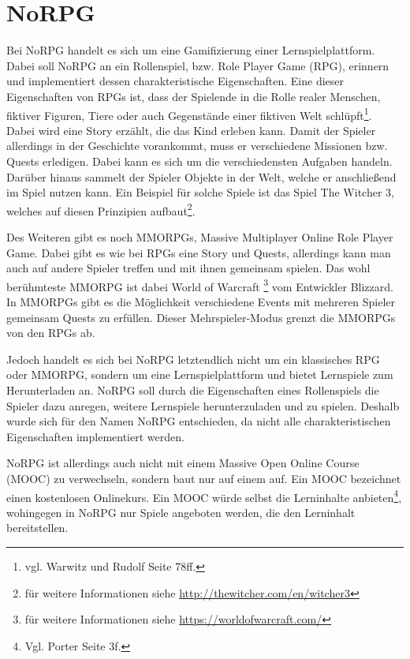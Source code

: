\chapter{NoRPG}		
Bei NoRPG handelt es sich um eine Gamifizierung einer Lernspielplattform. Dabei soll NoRPG an ein Rollenspiel, bzw. Role Player Game (RPG), erinnern und implementiert dessen charakteristische Eigenschaften. Eine dieser Eigenschaften von RPGs ist, dass der Spielende in die Rolle realer Menschen, fiktiver Figuren, Tiere oder auch Gegenstände einer fiktiven Welt schlüpft\footnote{vgl. Warwitz und Rudolf \cite{rpgSinn} Seite 78ff.}. Dabei wird eine Story erzählt, die das Kind erleben kann. Damit der Spieler allerdings in der Geschichte vorankommt, muss er verschiedene Missionen bzw. Quests erledigen. Dabei kann es sich um die verschiedensten Aufgaben handeln. Darüber hinaus sammelt der Spieler Objekte in der Welt, welche er anschließend im Spiel nutzen kann. Ein Beispiel für solche Spiele ist das Spiel The Witcher 3, welches auf diesen Prinzipien aufbaut\footnote{für weitere Informationen siehe \url{http://thewitcher.com/en/witcher3}}.
	
Des Weiteren gibt es noch MMORPGs, Massive Multiplayer Online Role Player Game. Dabei gibt es wie bei RPGs eine Story und Quests, allerdings kann man auch auf andere Spieler treffen und mit ihnen gemeinsam spielen. Das wohl berühmteste MMORPG ist dabei World of Warcraft \footnote{für weitere Informationen siehe \url{https://worldofwarcraft.com/}} vom Entwickler Blizzard. In MMORPGs gibt es die Möglichkeit verschiedene Events mit mehreren Spieler gemeinsam Quests zu erfüllen. Dieser Mehrspieler-Modus grenzt die MMORPGs von den RPGs ab.

Jedoch handelt es sich bei NoRPG letztendlich nicht um ein klassisches RPG oder MMORPG, sondern um eine Lernspielplattform und bietet Lernspiele zum Herunterladen an. NoRPG soll durch die Eigenschaften eines Rollenspiels die Spieler dazu anregen, weitere Lernspiele herunterzuladen und zu spielen. Deshalb wurde sich für den Namen NoRPG entschieden, da nicht alle charakteristischen Eigenschaften implementiert werden.

NoRPG ist allerdings auch nicht mit einem Massive Open Online Course (MOOC) zu verwechseln, sondern baut nur auf einem auf. Ein MOOC bezeichnet einen kostenlosen Onlinekurs. Ein MOOC würde selbst die Lerninhalte anbieten\footnote{Vgl. Porter \cite{moocBook} Seite 3f.}, wohingegen in NoRPG nur Spiele angeboten werden, die den Lerninhalt bereitstellen.

